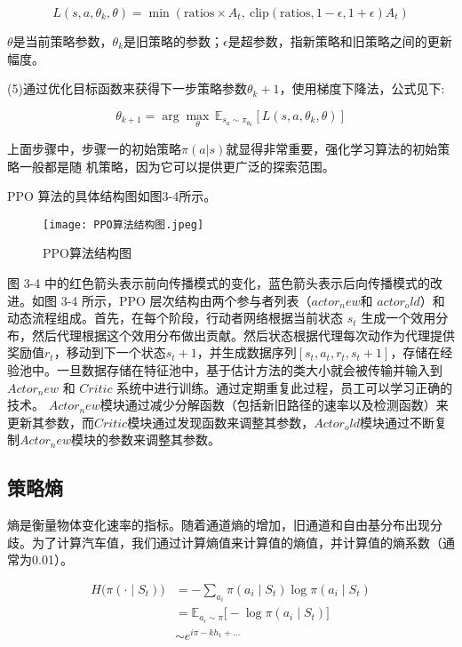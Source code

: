 \begin{equation}
	L(s, a, \theta_k, \theta) = \min\left( \text{ratios} \times A_t, \ \text{clip}\left( \text{ratios}, 1 - \epsilon, 1 + \epsilon \right) A_t \right)
\end{equation}

\(𝜃\)是当前策略参数，\(𝜃_𝑘\)是旧策略的参数；\(𝜖\)是超参数，指新策略和旧策略之间的更新幅度。

(5)通过优化目标函数来获得下一步策略参数\(𝜃_𝑘+1\)，使用梯度下降法，公式见下:

\begin{equation}
	\theta_{k+1} = \arg\max_{\theta} \, \mathbb{E}_{s_a \sim \pi_{\theta_k}} \left[ L(s, a, \theta_k, \theta) \right]
\end{equation}

上面步骤中，步骤一的初始策略\(𝜋(𝑎|𝑠)\)就显得非常重要，强化学习算法的初始策略一般都是随
机策略，因为它可以提供更广泛的探索范围。

PPO 算法的具体结构图\cite{YYKX202405015}如图3-4所示。

\begin{figure}[hbt]
	\centering
	\texttt{[image: PPO算法结构图.jpeg]}
	\caption{PPO算法结构图}
	\label{f.example}
\end{figure}

图 3-4 中的红色箭头表示前向传播模式的变化，蓝色箭头表示后向传播模式的改进。如图 3-4 所示，PPO 层次结构由两个参与者列表（\(actor_new\)和 \(actor_old）\)和动态流程组成。首先，在每个阶段，行动者网络根据当前状态 \(s_t\) 生成一个效用分布，然后代理根据这个效用分布做出贡献。然后状态根据代理每次动作为代理提供奖励值\(r_t\)，移动到下一个状态\(s_t+1\)，并生成数据序列\([s_t,a_t,r_t,s_t+1]\)，存储在经验池中。一旦数据存储在特征池中，基于估计方法的类大小就会被传输并输入到 \(Actor_new\) 和 \(Critic\) 系统中进行训练。通过定期重复此过程，员工可以学习正确的技术。 \(Actor_new\)模块通过减少分解函数（包括新旧路径的速率以及检测函数）来更新其参数，而\(Critic\)模块通过发现函数来调整其参数，\(Actor_old\)模块通过不断复制\(Actor_new\)模块的参数来调整其参数。

\subsection{策略熵}

熵是衡量物体变化速率的指标。随着通道熵的增加，旧通道和自由基分布出现分歧。为了计算汽车值，我们通过计算熵值\cite{tucker2018mirage}来计算值的熵值，并计算值的熵系数（通常为0.01）。

\begin{align}
	H\big(\pi(\cdot \mid S_t)\big) &= -\sum_{a_i} \pi(a_i \mid S_t) \log \pi(a_i \mid S_t) \\
	&= \mathbb{E}_{a_i \sim \pi} \Big[ -\log \pi(a_i \mid S_t) \Big] \\
	&\sim e^{i\pi - k h_1 + \dots}
\end{align}

